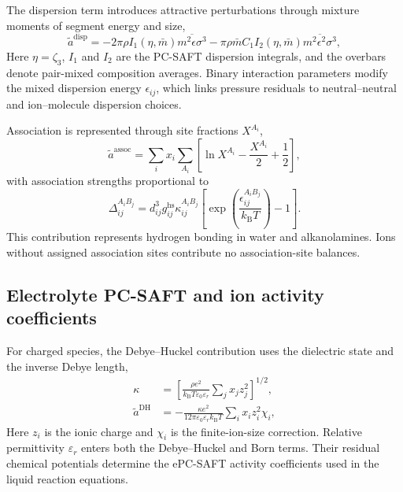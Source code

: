 The dispersion term introduces attractive perturbations through mixture moments of segment energy and size,
\begin{equation}
    \tilde{a}^{\mathrm{disp}}
    =
    -2\pi\rho I_1(\eta,\bar{m})\overline{m^2\epsilon\sigma^3}
    -\pi\rho\bar{m}C_1 I_2(\eta,\bar{m})
    \overline{m^2\epsilon^2\sigma^3},
    \label{eq:epcsaft-dispersion}
\end{equation}
Here \(\eta=\zeta_3\), \(I_1\) and \(I_2\) are the PC-SAFT dispersion integrals, and the overbars denote pair-mixed composition averages.  Binary interaction parameters modify the mixed dispersion energy \(\epsilon_{ij}\), which links pressure residuals to neutral--neutral and ion--molecule dispersion choices.

Association is represented through site fractions \(X^{A_i}\),
\begin{equation}
    \tilde{a}^{\mathrm{assoc}}
    =
    \sum_i x_i \sum_{A_i}
    \left[
        \ln X^{A_i}
        -\frac{X^{A_i}}{2}
        +\frac{1}{2}
    \right],
    \label{eq:epcsaft-association}
\end{equation}
with association strengths proportional to
\begin{equation}
    \Delta^{A_iB_j}_{ij}
    =
    d_{ij}^{3}g_{ij}^{\mathrm{hs}}
    \kappa^{A_iB_j}_{ij}
    \left[
        \exp\left(\frac{\epsilon^{A_iB_j}_{ij}}{k_{\mathrm{B}}T}\right)-1
    \right].
    \label{eq:epcsaft-association-strength}
\end{equation}
This contribution represents hydrogen bonding in water and alkanolamines.  Ions without assigned association sites contribute no association-site balances.

\subsection{Electrolyte PC-SAFT and ion activity coefficients}
For charged species, the Debye--Huckel contribution uses the dielectric state and the inverse Debye length,
\begin{align}
    \kappa
    &=
    \left[
        \frac{\rho e^2}{k_{\mathrm{B}}T\varepsilon_0\varepsilon_r}
        \sum_j x_j z_j^2
    \right]^{1/2},
    \label{eq:epcsaft-debye-kappa} \\
    \tilde{a}^{\mathrm{DH}}
    &=
    -\frac{\kappa e^2}{12\pi\varepsilon_0\varepsilon_r k_{\mathrm{B}}T}
    \sum_i x_i z_i^2\chi_i ,
    \label{eq:epcsaft-debye-helmholtz}
\end{align}
Here \(z_i\) is the ionic charge and \(\chi_i\) is the finite-ion-size correction.  Relative permittivity \(\varepsilon_r\) enters both the Debye--Huckel and Born terms.  Their residual chemical potentials determine the ePC-SAFT activity coefficients used in the liquid reaction equations.

